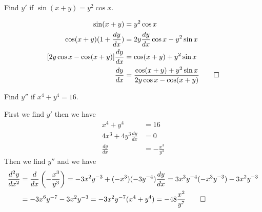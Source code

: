 \begin{problem}
    Find \(y'\) if \(\sin(x+y)=y^2\cos x\).
\end{problem}
\begin{solution}
    \begin{align*}
        \sin(x+y) &= y^2\cos x \\
        \cos(x+y)(1+\frac{dy}{dx}) &= 2y\frac{dy}{dx}\cos x-y^2\sin x \\
        [2y\cos x-\cos(x+y)]\frac{dy}{dx} &= \cos(x+y)+y^2\sin x \\
        \frac{dy}{dx}
        &= \frac{\cos(x+y)+y^2\sin x}{2y\cos x-\cos(x+y)} \qedhere
    \end{align*}
\end{solution}
\begin{problem}
    Find \(y''\) if \(x^4+y^4=16\).
\end{problem}
\begin{solution}
    First we find \(y'\) then we have
    \begin{align*}
        x^4+y^4 &= 16 \\ 4x^3+4y^3\frac{dy}{dx} &= 0 \\
        \frac{dy}{dx} &= -\frac{x^3}{y^3}
    \end{align*}
    Then we find \(y''\) and we have
    \begin{align*}
        \frac{d^2y}{dx^2} &= \frac{d}{dx}\left(-\frac{x^3}{y^3}\right)
        =-3x^2y^{-3}+(-x^3)(-3y^{-4})\frac{dy}{dx}
        =3x^3y^{-4}(-x^3y^{-3})-3x^2y^{-3} \\ &=-3x^6y^{-7}-3x^2y^{-3}
        =-3x^2y^{-7}(x^4+y^4)=-48\frac{x^2}{y^7} \qedhere
    \end{align*}
\end{solution}